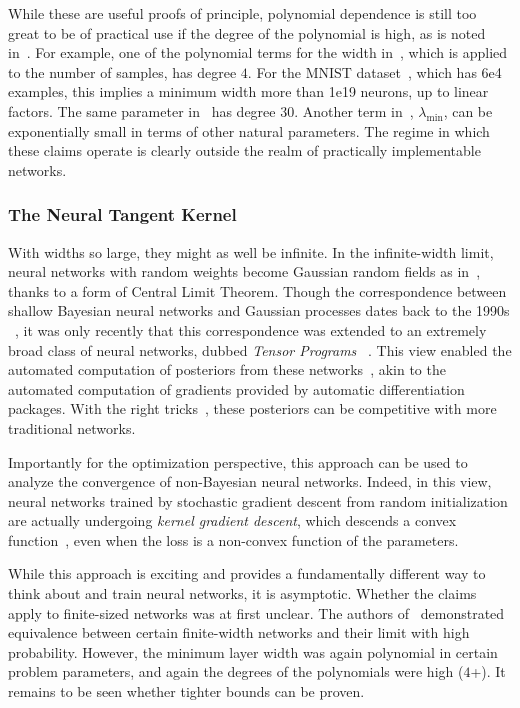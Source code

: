 \documentclass[../../thesis.tex]{subfiles}
\begin{document}
While these are useful proofs of principle,
polynomial dependence is still too great to be of practical use
if the degree of the polynomial is high,
as is noted in~\cite{allenzhu2018}.
For example, one of the polynomial terms for the width in~\cite{du2018},
which is applied to the number of samples, has degree $4$.
For the MNIST dataset~\cite{lecun2010},
which has 6e4 examples,
this implies a minimum width more than 1e19 neurons,
up to linear factors.
The same parameter in~\cite{allenzhu2018} has degree $30$.
Another term in~\cite{du2018}, $\lambda_{\min}$,
can be exponentially small in terms of other natural parameters.
The regime in which these claims operate
is clearly outside the realm of practically implementable networks.

\subsubsection{The Neural Tangent Kernel}

With widths so large,
they might as well be infinite.
In the infinite-width limit,
neural networks with random weights become
Gaussian random fields as in~,
thanks to a form of Central Limit Theorem.
Though the correspondence between shallow Bayesian neural networks
and Gaussian processes dates back to the 1990s%
~\cite{neal1996},
it was only recently that this correspondence was extended
to an extremely broad class of neural networks,
dubbed \emph{Tensor Programs}%
~\cite{yang2019}.
This view enabled the automated computation of posteriors
from these networks~\cite{novak2019},
akin to the automated computation of gradients
provided by automatic differentiation packages.
With the right tricks~\cite{li2019},
these posteriors can be competitive
with more traditional networks.

Importantly for the optimization perspective,
this approach can be used to analyze
the convergence of non-Bayesian neural networks.
Indeed, in this view, neural networks trained by
stochastic gradient descent from random initialization
are actually undergoing \emph{kernel gradient descent},
which descends a convex function~\cite{jacot2018},
even when the loss is a non-convex function of the parameters.

While this approach is exciting
and provides a fundamentally different way
to think about and train neural networks,
it is asymptotic.
Whether the claims apply to finite-sized networks was at first unclear.
The authors of~\cite{arora2019}
demonstrated equivalence between certain finite-width networks
and their limit with high probability.
However, the minimum layer width was again polynomial in certain problem parameters,
and again the degrees of the polynomials were high ($4$+).
It remains to be seen whether tighter bounds can be proven.
\end{document}
